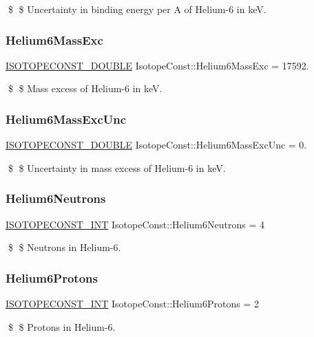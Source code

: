 \$ \$ Uncertainty in binding energy per A of Helium-\/6 in keV. \mbox{\label{group___isotope_const-_helium-_he6_gacd71416b87445729b29ff77bfbc806e5}} 
\subsubsection{\texorpdfstring{Helium6\+Mass\+Exc}{Helium6MassExc}}
{\footnotesize\ttfamily \mbox{\hyperlink{group___isotope_const-_macros_ga8f45a7272ce02c0b4c65c44636ed719a}{I\+S\+O\+T\+O\+P\+E\+C\+O\+N\+S\+T\+\_\+\+D\+O\+U\+B\+LE}} Isotope\+Const\+::\+Helium6\+Mass\+Exc = 17592.}

\$ \$ Mass excess of Helium-\/6 in keV. \mbox{\label{group___isotope_const-_helium-_he6_ga28805a492d89f4fbf6d8732c76f93838}} 
\subsubsection{\texorpdfstring{Helium6\+Mass\+Exc\+Unc}{Helium6MassExcUnc}}
{\footnotesize\ttfamily \mbox{\hyperlink{group___isotope_const-_macros_ga8f45a7272ce02c0b4c65c44636ed719a}{I\+S\+O\+T\+O\+P\+E\+C\+O\+N\+S\+T\+\_\+\+D\+O\+U\+B\+LE}} Isotope\+Const\+::\+Helium6\+Mass\+Exc\+Unc = 0.}

\$ \$ Uncertainty in mass excess of Helium-\/6 in keV. \mbox{\label{group___isotope_const-_helium-_he6_ga86f644d7cf011f88558f20e694b5bb42}} 
\subsubsection{\texorpdfstring{Helium6\+Neutrons}{Helium6Neutrons}}
{\footnotesize\ttfamily \mbox{\hyperlink{group___isotope_const-_macros_ga5f18360b3e99483a35c32d789e62621c}{I\+S\+O\+T\+O\+P\+E\+C\+O\+N\+S\+T\+\_\+\+I\+NT}} Isotope\+Const\+::\+Helium6\+Neutrons = 4}

\$ \$ Neutrons in Helium-\/6. \mbox{\label{group___isotope_const-_helium-_he6_ga706c09ca58fe4a6ffa5f1e9805d38a6a}} 
\subsubsection{\texorpdfstring{Helium6\+Protons}{Helium6Protons}}
{\footnotesize\ttfamily \mbox{\hyperlink{group___isotope_const-_macros_ga5f18360b3e99483a35c32d789e62621c}{I\+S\+O\+T\+O\+P\+E\+C\+O\+N\+S\+T\+\_\+\+I\+NT}} Isotope\+Const\+::\+Helium6\+Protons = 2}

\$ \$ Protons in Helium-\/6. 